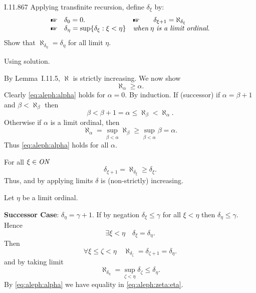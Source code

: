 \begin{lexcopy}{I.11.8}{67}
Applying transfinite recursion, define \(\delta_\xi\) by:
\begin{equation*}
\begin{array}{lll}
\mpointhand & \delta_0 = 0. &
    \mpointhand \qquad \delta_{\xi + 1} = \aleph_{\delta_\xi} \\
\mpointhand & \delta_\eta = \sup\{\delta_\xi: \xi < \eta\} &
  \textit{when}\; \eta\ \textit{is a limit ordinal}. \\
\end{array}
\end{equation*}
Show that \(\aleph_{\delta_\eta} = \delta_\eta\) for all limit \(\eta\).
\end{lexcopy}

Using \cite{WangFrederic} solution.

By Lemma~I.11.5, \(\aleph\) is strictly increasing.
We now show
\begin{equation} \label{eq:aleph:alpha}
\aleph_{\alpha} \geq \alpha.  %
\end{equation}
Clearly \eqref{eq:aleph:alpha} holds for \(\alpha=0\).
By induction.
If (successor) if \(\alpha=\beta+1\) and \(\beta < \aleph_\beta\) then
\begin{equation*}
\beta < \beta + 1 = \alpha \leq \aleph_\beta < \aleph_\alpha.
\end{equation*}
Otherwise if \(\alpha\) is a limit ordinal, then
\begin{equation*}
\aleph_\alpha
= \sup_{\beta < \alpha} \aleph_\beta
\geq \sup_{\beta < \alpha} \beta = \alpha.
\end{equation*}
Thus \eqref{eq:aleph:alpha} holds for all \(\alpha\).

For all \(\xi\in\mathit{ON}\)
\begin{equation*}
\delta_{\xi+1}=\aleph_{\delta_{\xi}}\geq\delta_{\xi}.
\end{equation*}
Thus, and by applying limits \(\delta\) is (non-strictly) increasing.

Let \(\eta\) be a limit ordinal.

\textbf{Successor Case}: \(\delta_\eta = \gamma+1\).
If by negation \(\delta_\xi \leq \gamma\) for all \(\xi < \eta\)
then \(\delta_\eta \leq \gamma\). Hence
\begin{equation*}
\exists \xi < \eta \quad \delta_\xi = \delta_\eta.
\end{equation*}
Then
\begin{equation*}
\forall \xi \leq \zeta < \eta \quad
  \aleph_{\delta_\zeta} = \delta_{\zeta + 1} = \delta_\eta.
\end{equation*}
and by taking limit
\begin{equation*} \label{eq:aleph:zeta:eta}
  \aleph_{\delta_\eta} = \sup_{\zeta<\eta}\delta_{\zeta} \leq \delta_\eta.
\end{equation*}
By \eqref{eq:aleph:alpha} we have equality in \eqref{eq:aleph:zeta:eta}.

